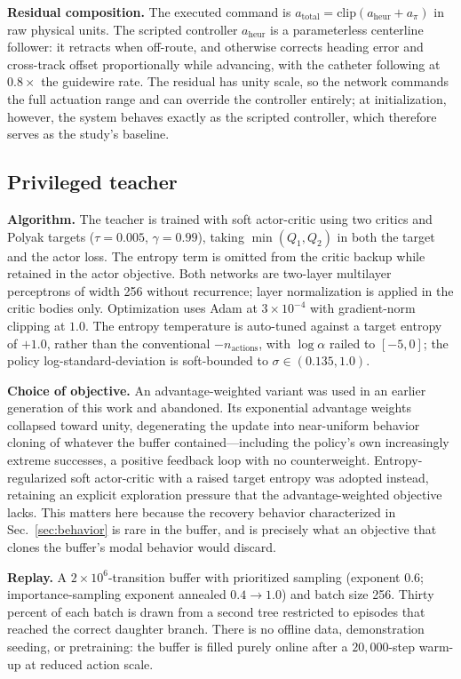 \textbf{Residual composition.} The executed command is
$a_{\mathrm{total}} = \mathrm{clip}\!\left(a_{\mathrm{heur}} + a_{\pi}\right)$ in raw physical
units. The scripted controller $a_{\mathrm{heur}}$ is a parameterless centerline follower: it
retracts when off-route, and otherwise corrects heading error and cross-track offset
proportionally while advancing, with the catheter following at $0.8\times$ the guidewire rate.
The residual has unity scale, so the network commands the full actuation range and can override
the controller entirely; at initialization, however, the system behaves exactly as the scripted
controller, which therefore serves as the study's baseline.

\subsection{Privileged teacher}

\textbf{Algorithm.} The teacher is trained with soft actor-critic using two critics and Polyak
targets ($\tau = 0.005$, $\gamma = 0.99$), taking $\min(Q_1, Q_2)$ in both the target and the
actor loss. The entropy term is omitted from the critic backup while retained in the actor
objective. Both networks are two-layer multilayer perceptrons of width 256 without recurrence;
layer normalization is applied in the critic bodies only. Optimization uses Adam at
$3 \times 10^{-4}$ with gradient-norm clipping at $1.0$. The entropy temperature is auto-tuned
against a target entropy of $+1.0$, rather than the conventional $-n_{\mathrm{actions}}$, with
$\log \alpha$ railed to $[-5, 0]$; the policy log-standard-deviation is soft-bounded to
$\sigma \in (0.135, 1.0)$.

\textbf{Choice of objective.} An advantage-weighted variant was used in an earlier generation of
this work and abandoned. Its exponential advantage weights collapsed toward unity, degenerating
the update into near-uniform behavior cloning of whatever the buffer contained---including the
policy's own increasingly extreme successes, a positive feedback loop with no counterweight.
Entropy-regularized soft actor-critic with a raised target entropy was adopted instead,
retaining an explicit exploration pressure that the advantage-weighted objective lacks. This
matters here because the recovery behavior characterized in Sec.~\ref{sec:behavior} is rare in
the buffer, and is precisely what an objective that clones the buffer's modal behavior would
discard.

\textbf{Replay.} A $2 \times 10^{6}$-transition buffer with prioritized sampling (exponent
$0.6$; importance-sampling exponent annealed $0.4 \rightarrow 1.0$) and batch size 256. Thirty
percent of each batch is drawn from a second tree restricted to episodes that reached the
correct daughter branch. There is no offline data, demonstration seeding, or pretraining: the
buffer is filled purely online after a $20{,}000$-step warm-up at reduced action scale.

